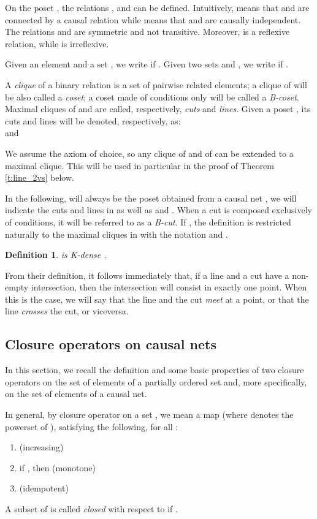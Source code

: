 \documentclass{eptcs}
\newtheorem{definition}{Definition}
\begin{document}
On the poset , the relations
,
and  can be
defined. Intuitively,  means that  and  are connected
by a causal relation while  means that  and  are
causally independent.
The relations  and  are symmetric and not transitive. 
Moreover,  is a reflexive relation, while  is irreflexive.

Given an element  and a set , 
we write   if .
Given two sets  and , 
we write  if
.

A \emph{clique} of a binary relation is a set of pairwise related elements;
a clique of  will be also called a \emph{coset};
a coset made of conditions only will be called a \emph{B-coset}.
Maximal cliques of  and  are called, respectively,
\emph{cuts} and \emph{lines}. Given a poset , its
cuts and lines will be denoted, respectively, as:\\

  and

We assume the axiom of choice, so any clique
of  and of  can be extended to a maximal
clique. This will be used in particular in the proof of Theorem
\ref{t:line_2vs} below.

In the following,  will always be the poset obtained
from a causal net , we will indicate the cuts and lines in 
as well as  and . When a cut is
composed exclusively of conditions, it will be referred to as a
\emph{B-cut}. If , the definition is restricted
naturally to the maximal cliques in  with the notation 
and .

\begin{definition}\label{d:K-density}
 is \emph{K-dense} .
\end{definition}
From their definition, it follows immediately that, if a line
and a cut have a non-empty intersection, then the intersection
will consist in exactly one point. When this is the case, we
will say that the line and the cut \emph{meet} at a point, or
that the line \emph{crosses} the cut, or viceversa.
\subsection{Closure operators on causal nets}\label{s:causal_closure}
In this section, we recall the definition and some basic
properties of two closure operators on the set of elements
of a partially ordered set and, more specifically, on the
set of elements of a causal net.

In general, by closure operator on a set , we mean a map
 (where  denotes
the powerset of ), satisfying the following,
for all :
\begin{enumerate}
  \item  (increasing)
  \item if , then  (monotone)
  \item  (idempotent)
\end{enumerate}
A subset  of  is called \emph{closed} with respect to 
if .
\end{document}
